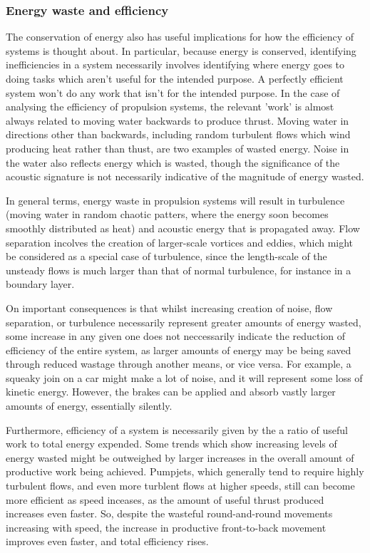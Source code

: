 \documentclass{article}\usepackage[]{graphicx}\usepackage[]{color}
\begin{document}
\subsubsection{Energy waste and efficiency}
The conservation of energy also has useful implications for how the efficiency of systems is thought about.  In particular, because energy is conserved, identifying inefficiencies in a system necessarily involves identifying where energy goes to doing tasks which aren't useful for the intended purpose.  A perfectly efficient system won't do any work that isn't for the intended purpose.  In the case of analysing the efficiency of propulsion systems, the relevant 'work' is almost always related to moving water backwards to produce thrust.  Moving water in directions other than backwards, including random turbulent flows which wind producing heat rather than thust, are two examples of wasted energy.  Noise in the water also reflects energy which is wasted, though the significance of the acoustic signature is not necessarily indicative of the magnitude of energy wasted.

In general terms, energy waste in propulsion systems will result in turbulence (moving water in random chaotic patters, where the energy soon becomes smoothly distributed as heat) and acoustic energy that is propagated away.  Flow separation incolves the creation of larger-scale vortices and eddies, which might be considered as a special case of turbulence, since the length-scale of the unsteady flows is much larger than that of normal turbulence, for instance in a boundary layer.

On important consequences is that whilst increasing creation of noise, flow separation, or turbulence necessarily represent greater amounts of energy wasted, some increase in any given one does not neccessarily indicate the reduction of efficiency of the entire system, as larger amounts of energy may be being saved through reduced wastage through another means, or vice versa. For example, a squeaky join on a car might make a lot of noise, and it will represent some loss of kinetic energy.  However, the brakes can be applied and absorb vastly larger amounts of energy, essentially silently.

Furthermore, efficiency of a system is necessarily given by the a ratio of useful work to total energy expended. Some trends which show increasing levels of energy wasted might be outweighed by larger increases in the overall amount of productive work being achieved.  Pumpjets, which generally tend to require highly turbulent flows, and even more turblent flows at higher speeds, still can become more efficient as speed inceases, as the amount of useful thrust produced increases even faster.  So, despite the wasteful round-and-round movements increasing with speed, the increase in productive front-to-back movement improves even faster, and total efficiency rises.
\end{document}
